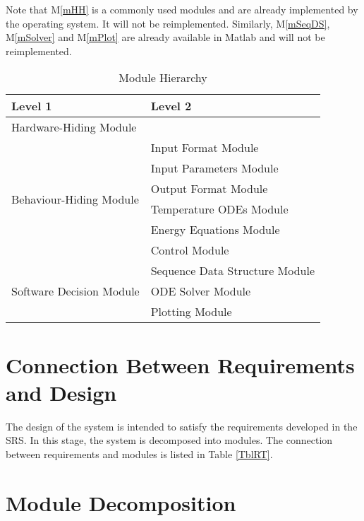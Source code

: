 \documentclass[12pt]{article}
\newcommand{\mref}[1]{M\ref{#1}}
\begin{document}
Note that \mref{mHH} is a commonly used modules and are already implemented by the operating
system.  It will not be reimplemented.  Similarly, \mref{mSeqDS}, \mref{mSolver}
and \mref{mPlot} are already available in Matlab and will not be reimplemented.

\begin{table}[h!]
\centering
\begin{tabular}{p{} p{}}
\toprule
\textbf{Level 1} & \textbf{Level 2}\\
\midrule

{Hardware-Hiding Module} & ~ \\
\midrule

\multirow{6}{0.3\textwidth}{Behaviour-Hiding Module} & Input Format Module\\
& Input Parameters Module\\
& Output Format Module\\
& Temperature ODEs Module\\
& Energy Equations Module\\ 
& Control Module\\
\midrule

\multirow{3}{0.3\textwidth}{Software Decision Module} & {Sequence Data Structure Module}\\
& ODE Solver Module\\
& Plotting Module\\
\bottomrule

\end{tabular}
\caption{Module Hierarchy}
\label{TblMH}
\end{table}

\section{Connection Between Requirements and Design} \label{SecConnection}

The design of the system is intended to satisfy the requirements developed in
the SRS. In this stage, the system is decomposed into modules. The connection
between requirements and modules is listed in Table \ref{TblRT}.

\section{Module Decomposition} \label{SecMD}
\end{document}
